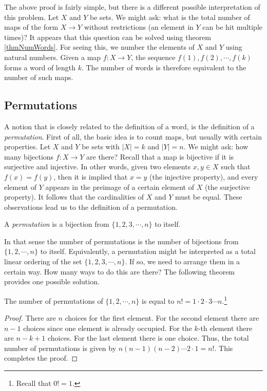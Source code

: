 The above proof is fairly simple, but there is a different possible interpretation of this problem. Let $X$ and $Y$ be sets. We might ask: what is the total
number of maps of the form $X \to Y$ without restrictions (an element in $Y$ can be hit multiple times)? It appears that this question can be solved using 
theorem \ref{thmNumWords}. For seeing this, we number the elements of $X$ and $Y$ using natural numbers.
Given a map $f:X \to Y$, the sequence $f(1),f(2), \cdots, f(k)$ forms a word of length $k$. The number of words is therefore equivalent to the number of such maps.

\subsection{Permutations}

A notion that is closely related to the definition of a word, is the definition of a \textit{permutation}. First of all, the basic idea is to count maps, but 
usually with certain properties. Let $X$ and $Y$ be sets with $|X|=k$ and $|Y|=n$. We might ask: how many bijections $f:X \to Y$ are there? Recall that
a map is bijective if it is surjective and injective. In other words, given two elements $x,y \in X$ such that $f(x)=f(y)$, then it is implied that $x=y$ (the injective property), and 
every element of $Y$ appears in the preimage of a certain element of $X$ (the surjective property). It follows that the cardinalities of $X$ and $Y$ must be equal.
These observations lead us to the definition of a permutation.

\begin{defn}[permutation]
A \textit{permutation} is a bijection from $\{1, 2, 3, \cdots, n\}$ to itself.
\end{defn}
\noindent
In that sense the number of permutations is the number of bijections from $\{1, 2, \cdots, n\}$ to itself.
Equivalently, a permutation might be interpreted as a total linear ordering of the set $\{1, 2, 3, \cdots, n\}$.
If so, we need to arrange them in a certain way. How many ways to do this are there? 
The following theorem provides one possible solution.

\begin{theorem}
The number of permutations of $\{1, 2, \cdots, n\}$ is equal to $n!=1\cdot 2 \cdot 3 \cdots n$.\footnote{Recall that $0!=1$.}
\end{theorem}

\begin{proof}
There are $n$ choices for the first element. For the second element there are $n-1$ choices since
one element is already occupied. For the $k$-th element there are $n-k+1$ choices. For the last element there is one choice.
Thus, the total number of permutations is given by $n(n-1)(n-2)\cdots 2 \cdot 1=n!$. This completes the proof.
\end{proof}

